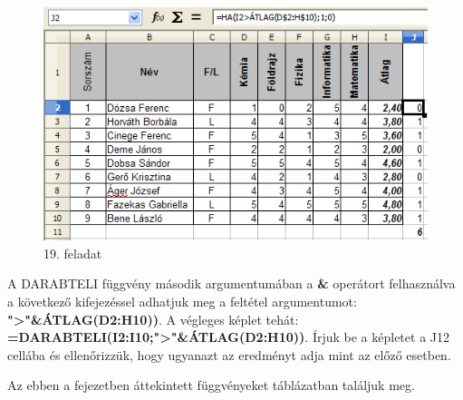\begin{figure}[!h]
\begin{center}
\includegraphics[width=13.254cm]{oocalcv2-img93.png}
\caption{19. feladat}\label{19-feladat}
\end{center}
\end{figure}

A DARABTELI függvény második argumentumában a \textbf{\&}
operátort felhasználva a következő kifejezéssel adhatjuk
meg a feltétel argumentumot:
\textsf{\textbf{">"\&ÁTLAG(D2:H10))}}.
A végleges képlet tehát:
\textsf{\textbf{=DARABTELI(I2:I10;">"\&ÁTLAG(D2:H10))}}.
Írjuk be a képletet a J12 cellába és ellenőrizzük, hogy
ugyanazt az eredményt adja mint az előző esetben.

Az ebben a fejezetben áttekintett függvényeket
 táblázatban találjuk meg.


